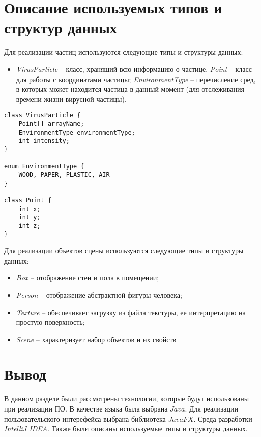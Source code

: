 \section{Описание используемых типов и структур данных}

Для реализации частиц используются следующие типы и структуры данных:
\begin{itemize} 
	\item \textit{VirusParticle} -- класс, хранящий всю информацию о частице.
	\subitem  \textit{Point} -- класс для работы с координатами частицы;
	\subitem \textit{EnvironmentType} -- перечисление сред, в которых может находится частица в данный момент (для отслеживания времени жизни вирусной частицы).
\end{itemize}

\begin{center}
	\captionsetup{justification=raggedright,singlelinecheck=off}
	\begin{lstlisting}[label=lst:sphere,caption=Структуры данных для хранени информации о частицах вируса]
class VirusParticle {
	Point[] arrayName;
	EnvironmentType environmentType;
	int intensity;
}
		
enum EnvironmentType {
	WOOD, PAPER, PLASTIC, AIR
}
		
class Point {
	int x;
	int y;
	int z;
}
	\end{lstlisting}
\end{center}

Для реализации объектов сцены используются следующие типы и структуры данных:

\begin{itemize} 
	\item \textit{Box} -- отображение стен и пола в помещении;
	\item \textit{Person} -- отображение абстрактной фигуры человека;
	\item \textit{Texture} -- обеспечивает загрузку из файла текстуры, ее интерпретацию на простую поверхность;
	\item \textit{Scene} -- характеризует набор объектов и их свойств
\end{itemize}


\section*{Вывод}

В данном разделе были рассмотрены технологии, которые будут использованы при реализации ПО. В качестве языка была выбрана $Java$.  Для реализации пользовательского интерефейса выбрана библиотека $JavaFX$. Среда разработки -  \textit{IntelliJ IDEA}. Также были описаны используемые типы и структуры данных.

